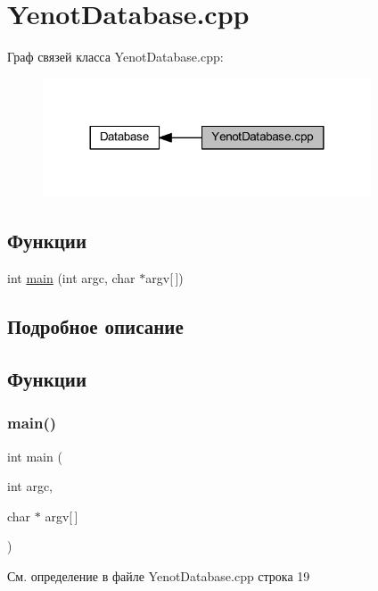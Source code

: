 \hypertarget{group__yenotdatabasecpp}{}\section{Yenot\+Database.\+cpp}
\label{group__yenotdatabasecpp}
Граф связей класса Yenot\+Database.\+cpp\+:
\nopagebreak
\begin{figure}[H]
\begin{center}
\leavevmode
\includegraphics[width=276pt]{group__yenotdatabasecpp}
\end{center}
\end{figure}
\subsection*{Функции}
\begin{DoxyCompactItemize}
\item 
int \mbox{\hyperlink{group__yenotdatabasecpp_ga0ddf1224851353fc92bfbff6f499fa97}{main}} (int argc, char $\ast$argv\mbox{[}$\,$\mbox{]})
\end{DoxyCompactItemize}


\subsection{Подробное описание}


\subsection{Функции}
\mbox{\label{group__yenotdatabasecpp_ga0ddf1224851353fc92bfbff6f499fa97}} 
\subsubsection{\texorpdfstring{main()}{main()}}
{\footnotesize\ttfamily int main (\begin{DoxyParamCaption}\item[{int}]{argc,  }\item[{char $\ast$}]{argv\mbox{[}$\,$\mbox{]} }\end{DoxyParamCaption})}



См. определение в файле Yenot\+Database.\+cpp строка 19


